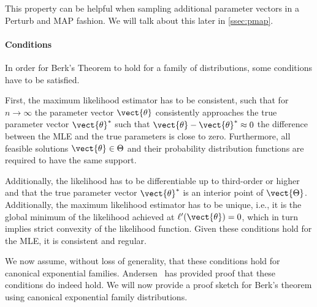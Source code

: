         This property can be helpful when sampling additional parameter vectors in a Perturb and MAP fashion. We will talk about this later in \autoref{ssec:pmap}.
        
        \paragraph*{Conditions}
        In order for Berk's Theorem to hold for a family of distributions, some conditions have to be satisfied.

        First, the maximum likelihood estimator has to be consistent, such that for $n\rightarrow \infty$ the parameter vector $\vect{\theta}$ consistently approaches the true parameter vector $\vect{\theta}^*$ such that $\vect{\theta} - \vect{\theta}^* \approx 0$ the difference between the MLE and the true parameters is close to zero.
        Furthermore, all feasible solutions $\vect{\theta}  \in \Theta$ and their probability distribution functions are required to have the same support.
        
        Additionally, the likelihood has to be differentiable up to third-order or higher and that the true parameter vector $\vect{\theta}^*$ is an interior point of $\vect{\Theta}$.
        Additionally, the maximum likelihood estimator has to be unique, i.e., it is the global minimum of the likelihood achieved at $\ell'(\vect{\theta}) = 0$, which in turn implies strict convexity of the likelihood function.
        Given these conditions hold for the MLE, it is consistent and regular.

        We now assume, without loss of generality, that these conditions hold for canonical exponential families.
        Andersen~\cite{andersen1970asymptotic} has provided proof that these conditions do indeed hold.
        We will now provide a proof sketch for Berk's theorem using canonical exponential family distributions.

